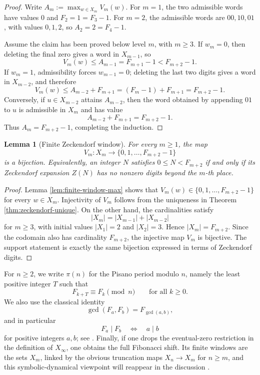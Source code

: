 \documentclass[12pt,a4paper]{article}
\theoremstyle{plain}
\newtheorem{lemma}[theorem]{Lemma}
\theoremstyle{definition}
\numberwithin{equation}{section}
\begin{document}
\begin{proof}
Write \(A_m:=\max_{w\in X_m}V_m(w)\). For \(m=1\), the two admissible words have values \(0\) and \(F_2=1=F_3-1\). For \(m=2\), the admissible words are \(00,10,01\), with values \(0,1,2\), so \(A_2=2=F_4-1\).

Assume the claim has been proved below level \(m\), with \(m\ge 3\). If \(w_m=0\), then deleting the final zero gives a word in \(X_{m-1}\), so
\[
V_m(w)\le A_{m-1}=F_{m+1}-1<F_{m+2}-1.
\]
If \(w_m=1\), admissibility forces \(w_{m-1}=0\); deleting the last two digits gives a word in \(X_{m-2}\), and therefore
\[
V_m(w)
\le A_{m-2}+F_{m+1}
=(F_m-1)+F_{m+1}
=F_{m+2}-1.
\]
Conversely, if \(u\in X_{m-2}\) attains \(A_{m-2}\), then the word obtained by appending \(01\) to \(u\) is admissible in \(X_m\) and has value
\[
A_{m-2}+F_{m+1}=F_{m+2}-1.
\]
Thus \(A_m=F_{m+2}-1\), completing the induction.
\end{proof}

\begin{lemma}[Finite Zeckendorf window]\label{lem:zeckendorf-range-bijection}
For every \(m\ge 1\), the map
\[
V_m:X_m\longrightarrow \{0,1,\dots,F_{m+2}-1\}
\]
is a bijection. Equivalently, an integer \(N\) satisfies \(0\le N<F_{m+2}\) if and only if its Zeckendorf expansion \(Z(N)\) has no nonzero digits beyond the \(m\)-th place.
\end{lemma}

\begin{proof}
Lemma \ref{lem:finite-window-max} shows that \(V_m(w)\in\{0,1,\dots,F_{m+2}-1\}\) for every \(w\in X_m\). Injectivity of \(V_m\) follows from the uniqueness in Theorem \ref{thm:zeckendorf-unique}. On the other hand, the cardinalities satisfy
\[
|X_m|=|X_{m-1}|+|X_{m-2}|
\]
for \(m\ge 3\), with initial values \(|X_1|=2\) and \(|X_2|=3\). Hence \(|X_m|=F_{m+2}\). Since the codomain also has cardinality \(F_{m+2}\), the injective map \(V_m\) is bijective. The support statement is exactly the same bijection expressed in terms of Zeckendorf digits.
\end{proof}

For \(n\ge 2\), we write \(\pi(n)\) for the Pisano period modulo \(n\), namely the least positive integer \(T\) such that
\[
F_{k+T}\equiv F_k \pmod n
\qquad\text{for all }k\ge 0.
\]
We also use the classical identity
\[
\gcd(F_a,F_b)=F_{\gcd(a,b)},
\]
and in particular
\[
F_a\mid F_b \quad\Longleftrightarrow\quad a\mid b
\]
for positive integers \(a,b\); see \cite{Wall1960,Koshy2018}. Finally, if one drops the eventual-zero restriction in the definition of \(X_\infty\), one obtains the full Fibonacci shift. Its finite windows are the sets \(X_m\), linked by the obvious truncation maps \(X_n\to X_m\) for \(n\ge m\), and this symbolic-dynamical viewpoint will reappear in the discussion \cite{LindMarcus1995,PytheasFogg2002}.
\end{document}
